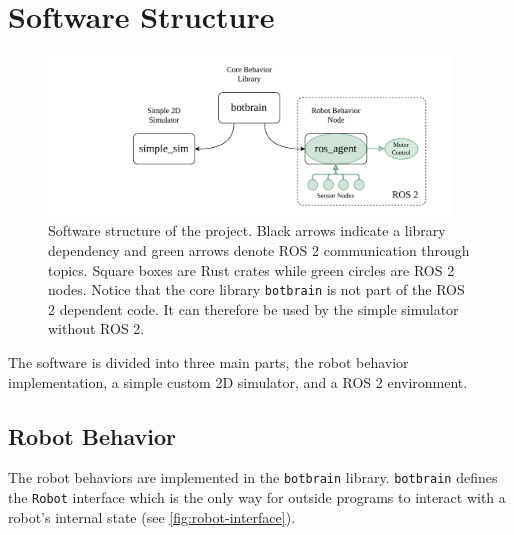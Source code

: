 \section{Software Structure}

\begin{figure}
    \begin{center}
        \includegraphics[width=0.95\textwidth]{figures/software-structure.pdf}
    \end{center}
    \caption{Software structure of the project. Black arrows indicate a library dependency and green arrows denote ROS 2 communication through topics. Square boxes are Rust crates while green circles are ROS 2 nodes. Notice that the core library \texttt{botbrain} is not part of the ROS 2 dependent code. It can therefore be used by the simple simulator without ROS 2.}\label{fig:}
\end{figure}


The software is divided into three main parts, the robot behavior implementation, a simple custom 2D
simulator, and a ROS 2 environment.

\subsection{Robot Behavior}
The robot behaviors are implemented in the \texttt{botbrain} library. \texttt{botbrain} defines the \texttt{Robot} interface
which is the only way for outside programs to interact with a robot’s internal state (see \cref{fig:robot-interface}).

